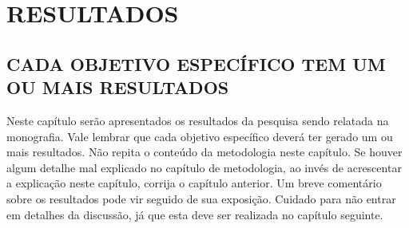 \chapter{RESULTADOS}
\thispagestyle{empty}
\section{CADA OBJETIVO ESPECÍFICO TEM UM OU MAIS RESULTADOS}
Neste capítulo serão apresentados os resultados da pesquisa sendo relatada na monografia. Vale lembrar que cada objetivo específico deverá ter gerado um ou mais resultados.
Não repita o conteúdo da metodologia neste capítulo. Se houver algum detalhe mal explicado no capítulo de metodologia, ao invés de acrescentar a explicação neste capítulo, corrija o capítulo anterior.
Um breve comentário sobre os resultados pode vir seguido de sua exposição. Cuidado para não entrar em detalhes da discussão, já que esta deve ser realizada no capítulo seguinte.
